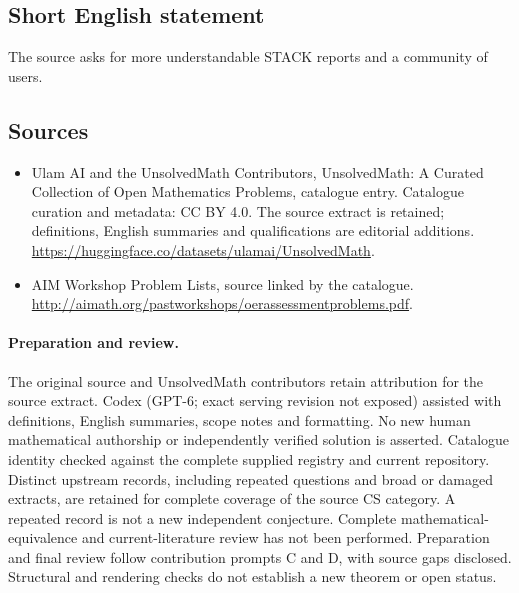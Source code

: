\documentclass[11pt]{article}
\begin{document}
\subsection{Short English statement}
The source asks for more understandable STACK reports and a community of users.
\subsection{Sources}
\begin{itemize}
\item[\hypertarget{source:statement:1}{S1}] Ulam AI and the UnsolvedMath Contributors, UnsolvedMath: A Curated Collection of Open Mathematics Problems, catalogue entry. Catalogue curation and metadata: CC BY 4.0. The source extract is retained; definitions, English summaries and qualifications are editorial additions.
\url{https://huggingface.co/datasets/ulamai/UnsolvedMath}.
\item[\hypertarget{source:statement:2}{S2}] AIM Workshop Problem Lists, source linked by the catalogue.
\url{http://aimath.org/pastworkshops/oerassessmentproblems.pdf}.
\end{itemize}
\paragraph{Preparation and review.}
The original source and UnsolvedMath contributors retain attribution for the source extract. Codex (GPT-6; exact serving revision not exposed) assisted with definitions, English summaries, scope notes and formatting. No new human mathematical authorship or independently verified solution is asserted. Catalogue identity checked against the complete supplied registry and current repository. Distinct upstream records, including repeated questions and broad or damaged extracts, are retained for complete coverage of the source CS category. A repeated record is not a new independent conjecture. Complete mathematical-equivalence and current-literature review has not been performed. Preparation and final review follow contribution prompts C and D, with source gaps disclosed. Structural and rendering checks do not establish a new theorem or open status.
\label{end:statement}
\end{document}

